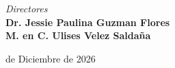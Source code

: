 \begin{titlepage}
	
	{\fontsize{14}{16.8}\selectfont \textit{Directores}}\\[0.4cm]
	{\fontsize{14}{16.8}\selectfont \textbf{Dr. Jessie Paulina Guzman Flores}}\\[.3cm]
	{\fontsize{14}{16.8}\selectfont \textbf{M. en C. Ulises Velez Saldaña}}\\[.3cm]
	\vfill
	
	{\fontsize{12}{14.4} de Diciembre de 2026}
	
\end{titlepage}

\restoregeometry






	

